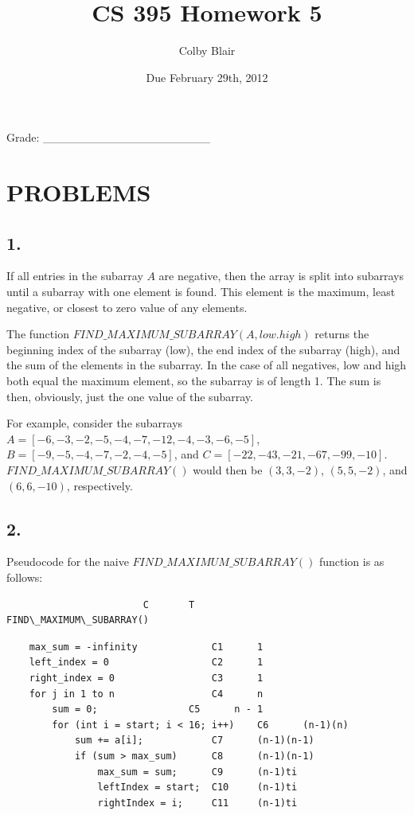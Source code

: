 \documentclass[11pt,letterpaper]{article}
\date{Due February 29th, 2012}
\title{CS 395 Homework 5}
\author{Colby Blair}
\begin{document}
\maketitle

\begin{center}

Grade: \_\_\_\_\_\_\_\_\_\_\_\_\_\_\_\_\_\_\_\_
\end{center}

\thispagestyle{empty}

\pagebreak


\section*{PROBLEMS}

\subsection*{1.}
If all entries in the subarray $A$ are negative, then the array is split into subarrays until a subarray with one
element is found. This element is the maximum, least negative, or closest to zero value of any elements.

The function $FIND\_MAXIMUM\_SUBARRAY(A,low.high)$ returns the beginning index of the subarray (low), the end index
of the subarray (high), and the sum of the elements in the subarray. In the case of all negatives, low and high
both equal the maximum element, so the subarray is of length 1. The sum is then, obviously, just the one 
value of the subarray.

For example, consider the subarrays $A = [-6 ,-3, -2, -5, -4, -7, -12, -4, -3 , -6, -5]$, 
$B = [-9, -5, -4, -7, -2, -4 ,-5]$, and $C = [-22, -43, -21, -67, -99, -10]$. 
$FIND\_MAXIMUM\_SUBARRAY()$ would then be $(3,3,-2)$, $(5,5,-2)$, and $(6,6,-10)$, respectively.

\subsection*{2.}
 Pseudocode for the naive $FIND\_MAXIMUM\_SUBARRAY()$ function is as follows:

\scriptsize
\begin{lstlisting}
						C 		T
FIND\_MAXIMUM\_SUBARRAY()
\end{lstlisting}

\lstset{numbers=left}
\begin{lstlisting}
	max_sum = -infinity				C1		1
	left_index = 0					C2		1
	right_index = 0					C3		1
	for j in 1 to n 				C4		n
		sum = 0;				C5		n - 1
		for (int i = start; i < 16; i++) 	C6		(n-1)(n)
			sum += a[i];			C7		(n-1)(n-1)
			if (sum > max_sum)		C8		(n-1)(n-1)
				max_sum = sum;		C9		(n-1)ti
				leftIndex = start;	C10		(n-1)ti
 				rightIndex = i;		C11		(n-1)ti
\end{lstlisting}
\end{document}
